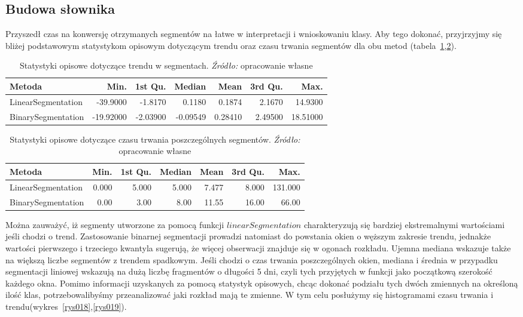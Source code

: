 \documentclass[polish, twoside, 12pt, a4paper]{article}
\theoremstyle{definition}
\theoremstyle{plain}
\theoremstyle{remark}
\begin{document}
\subsection{Budowa słownika}

Przyszedł czas na konwersję otrzymanych segmentów na łatwe w interpretacji i wnioskowaniu klasy. Aby tego dokonać, przyjrzyjmy się bliżej podstawowym statystykom opisowym 
dotyczącym trendu oraz czasu trwania segmentów dla obu metod (tabela~\ref{tab002},\ref{tab003}).

 \begin{table}[H]
\caption{Statystyki opisowe dotyczące trendu w segmentach. \textit{Źródło:} opracowanie własne}
\label{tab002} 
\begin{tabular}{lrrrrrr}
Metoda   &  Min. &  1st Qu.  &  Median  &  Mean   &  3rd Qu. & Max. \\ \hline
LinearSegmentation &-39.9000 &  -1.8170  &  0.1180  &  0.1874  &  2.1670  & 14.9300 \\
BinarySegmentation & -19.92000 & -2.03900 & -0.09549 &  0.28410 &  2.49500 & 18.51000 
 \end{tabular}
 \end{table}


 \begin{table}[H]
\caption{Statystyki opisowe dotyczące czasu trwania poszczególnych segmentów. \textit{Źródło:} opracowanie własne}
\label{tab003}
 \begin{tabular}{lrrrrrr}
Metoda   &  Min. &  1st Qu.  &  Median  &  Mean   &  3rd Qu. & Max. \\ \hline
LinearSegmentation &   0.000  & 5.000 &  5.000 &  7.477  & 8.000 & 131.000 \\
BinarySegmentation &  0.00  &  3.00 &   8.00 &  11.55 &  16.00 &  66.00 
 \end{tabular}
 \end{table}

Można zauważyć, iż segmenty utworzone za pomocą funkcji \(linear Segmentation\) charakteryzują się bardziej ekstremalnymi wartościami jeśli chodzi o trend. Zastosowanie binarnej 
segmentacji prowadzi natomiast do powstania okien o węższym zakresie trendu, jednakże wartości pierwszego i trzeciego kwantyla sugerują, że więcej obserwacji znajduje się w ogonach 
rozkładu. Ujemna mediana wskazuje także na większą liczbe segmentów z trendem spadkowym. Jeśli chodzi o czas trwania poszczególnych okien, mediana i średnia w przypadku segmentacji 
liniowej wskazują na dużą liczbę fragmentów o długości 5 dni, czyli tych przyjętych w funkcji jako początkową szerokość każdego okna. Pomimo informacji uzyskanych za pomocą 
statystyk opisowych, chcąc dokonać podziału tych dwóch zmiennych na określoną ilość klas, potrzebowalibyśmy przeanalizować jaki rozkład mają te zmienne. W tym celu posłużymy się 
histogramami czasu trwania i trendu(wykres~\ref{rys018},\ref{rys019}).
\end{document}
